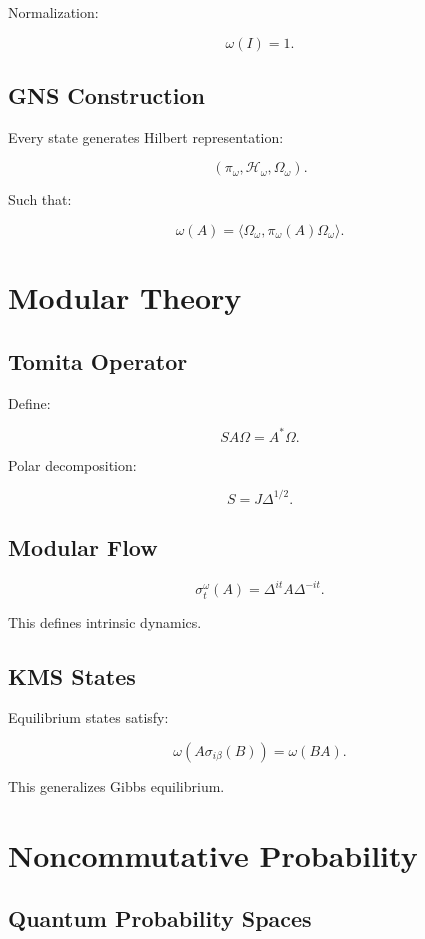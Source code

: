 \documentclass[11pt]{book}
\begin{document}
Normalization:

\[
\omega(I)=1.
\]

\section{GNS Construction}

Every state generates Hilbert representation:

\[
(\pi_\omega,\mathcal H_\omega,\Omega_\omega).
\]

Such that:

\[
\omega(A)
=
\langle \Omega_\omega,
\pi_\omega(A)\Omega_\omega\rangle.
\]

\chapter{Modular Theory}

\section{Tomita Operator}

Define:

\[
SA\Omega
=
A^*\Omega.
\]

Polar decomposition:

\[
S=J\Delta^{1/2}.
\]

\section{Modular Flow}

\[
\sigma_t^\omega(A)
=
\Delta^{it}A\Delta^{-it}.
\]

This defines intrinsic dynamics.

\section{KMS States}

Equilibrium states satisfy:

\[
\omega(A\sigma_{i\beta}(B))
=
\omega(BA).
\]

This generalizes Gibbs equilibrium.

\chapter{Noncommutative Probability}

\section{Quantum Probability Spaces}
\end{document}
